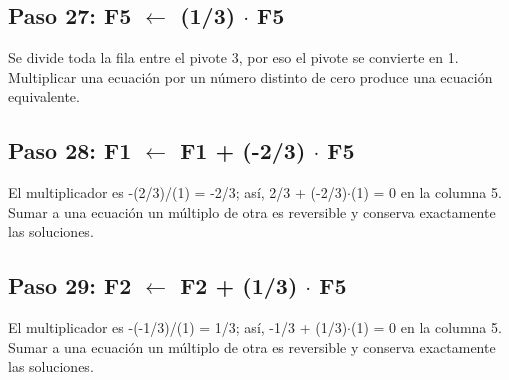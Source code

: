 \documentclass[conference]{IEEEtran}
\begin{document}
\medskip
\subsection*{Paso 27: F5 \(\leftarrow\) (1/3) \(\cdot\) F5}
Se divide toda la fila entre el pivote 3, por eso el pivote se convierte en 1. Multiplicar una ecuación por un número distinto de cero produce una ecuación equivalente.


\medskip
\subsection*{Paso 28: F1 \(\leftarrow\) F1 + (-2/3) \(\cdot\) F5}
El multiplicador es -(2/3)/(1) = -2/3; así, 2/3 + (-2/3)\(\cdot\)(1) = 0 en la columna 5. Sumar a una ecuación un múltiplo de otra es reversible y conserva exactamente las soluciones.


\medskip
\subsection*{Paso 29: F2 \(\leftarrow\) F2 + (1/3) \(\cdot\) F5}
El multiplicador es -(-1/3)/(1) = 1/3; así, -1/3 + (1/3)\(\cdot\)(1) = 0 en la columna 5. Sumar a una ecuación un múltiplo de otra es reversible y conserva exactamente las soluciones.
\end{document}
